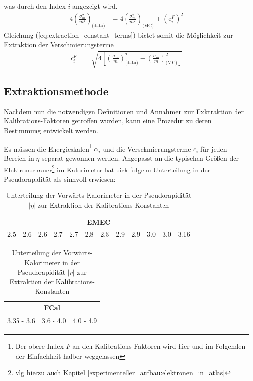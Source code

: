 was durch den Index $i$ angezeigt wird.
\begin{align}
    \label{eq:extraction_constant_terms}
    4\left(\frac{\sigma_m^2}{m^2}\right)_\text{(data)}
        &= 4\left(\frac{\sigma_m^2}{m^2}\right)_\text{(MC)}
        + \left(c_i^F\right)^2
\end{align}
Gleichung (\ref{eq:extraction_constant_terms}) bietet somit die Möglichkeit zur
Extraktion der Verschmierungsterme
\begin{align}
    c_i^F &= \sqrt{ 4 \left[ \left(\frac{\sigma_m}{m}\right)^2_\text{(data)}
             - \left(\frac{\sigma_m}{m}\right)^2_\text{(MC)} \right] }
    \label{eq:constant_terms}
\end{align}



\subsection{Extraktionsmethode}
\label{energy_calibration:extraktionsmethode}
Nachdem nun die notwendigen Definitionen und Annahmen zur Exktraktion der
Kali\-brations-Faktoren getroffen wurden, kann eine Prozedur zu deren
Bestimmung entwickelt werden.

Es müssen die Energieskalen\footnote{Der obere Index $F$ an den
Kalibrations-Faktoren wird hier und im Folgenden der Einfachheit halber
weggelassen} $\alpha_i$ und die Verschmierungsterme $c_i$ für jeden Bereich in
$\eta$ separat gewonnen werden. Angepasst an die typischen Größen der
Elektronschauer\footnote{vlg hierzu auch Kapitel
\ref{experimenteller_aufbau:elektronen_in_atlas}} im Kalorimeter hat sich
folgene Unterteilung in der Pseudorapidität als sinnvoll erwiesen:

\begin{table}[h]
    \centering
    \begin{tabular}{|c|c|c|c|c|c|}
        \multicolumn{6}{c}{\textbf{EMEC}} \\
        \hline
        2.5 - 2.6 & 2.6 - 2.7 & 2.7 - 2.8 & 2.8 - 2.9 & 2.9 - 3.0 & 3.0 - 3.16
        \\ \hline
    \end{tabular}
    \vspace{10pt}

    \begin{tabular}{|c|c|c|}
        \multicolumn{3}{c}{\textbf{FCal}} \\
        \hline
        3.35 - 3.6 & 3.6 - 4.0 & 4.0 - 4.9 \\
        \hline
    \end{tabular}
    \caption{Unterteilung der Vorwärts-Kalorimeter in der Pseudorapidität
             $|\eta|$ zur Extraktion der Kalibrations-Konstanten}
    \label{tab:calibration_binning}
\end{table}

